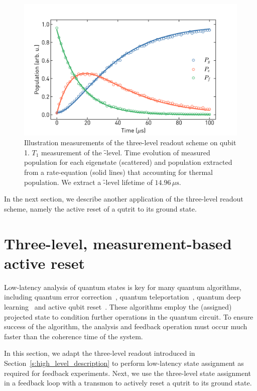 \begin{figure}[ht]
  \centering
     \includegraphics[width=\textwidth]{appendices/qutrit_readout/figs/readout_t1ef_20200302_004024.png}
\caption{Illustration measurements of the three-level readout scheme on qubit 1.  $T_1$ measurement of the \f-level. Time evolution of measured population for each eigenstate (scattered) and population extracted from a rate-equation (solid lines) that accounting for thermal population. We extract a \f-level lifetime of $14.96\, \mu \textrm{s}$.}
\label{fig:t1ef_3lv}
\end{figure}

In the next section, we describe another application of the three-level readout scheme, namely the active reset of a qutrit to its ground state. 

\section{Three-level, measurement-based active reset} \label{sec:active_reset}
Low-latency analysis of quantum states is key for many quantum algorithms, including quantum error correction~\cite{Reed2012RealizationCircuits}, quantum teleportation~\cite{Steffen2013DeterministicSystem}, quantum deep learning~\cite{Cao2017QuantumComputers} and active qubit reset~\cite{Magnard2018FastQubit, Salathe2018Low-LatencyCommunicationb}. These algorithms employ the (assigned) projected state to condition further operations in the quantum circuit. To ensure success of the algorithm, the analysis and feedback operation must occur much faster than the coherence time of the system. 

In this section, we adapt the three-level readout introduced in Section~\ref{s:high_level_description} to perform low-latency state assignment as required for feedback experiments. Next, we use the three-level state assignment in a feedback loop with a transmon to actively reset a qutrit to its ground state. 

